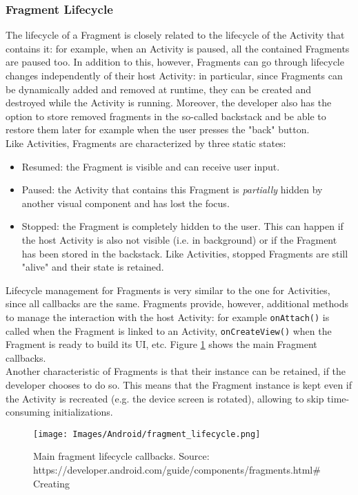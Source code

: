 \documentclass[11pt,a4paper,notitlepage]{article}
\begin{document}
\subsubsection{Fragment Lifecycle}
The lifecycle of a Fragment is closely related to the lifecycle of the Activity that contains it: for example, when an Activity is paused, all the contained Fragments are paused too. In addition to this, however, Fragments can go through lifecycle changes independently of their host Activity: in particular, since Fragments can be dynamically added and removed at runtime, they can be created and destroyed while the Activity is running. Moreover, the developer also has the option to store removed fragments in the so-called backstack and be able to restore them later for example when the user presses the "back" button.\medskip \\
Like Activities, Fragments are characterized by three static states:
\begin{itemize}
	\item Resumed: the Fragment is visible and can receive user input.
	\item Paused: the Activity that contains this Fragment is \textit{partially} hidden by another visual component and has lost the focus.
	\item Stopped: the Fragment is completely hidden to the user. This can happen if the host Activity is also not visible (i.e. in background) or if the Fragment has been stored in the backstack. Like Activities, stopped Fragments are still "alive" and their state is retained.
\end{itemize}
Lifecycle management for Fragments is very similar to the one for Activities, since all callbacks are the same. Fragments provide, however, additional methods to manage the interaction with the host Activity: for example \texttt{onAttach()} is called when the Fragment is linked to an Activity, \texttt{onCreateView()} when the Fragment is ready to build its UI, etc. Figure \ref{fig:fra_lifec} shows the main Fragment callbacks.\bigskip \\
Another characteristic of Fragments is that their instance can be retained, if the developer chooses to do so. This means that the Fragment instance is kept even if the Activity is recreated (e.g. the device screen is rotated), allowing to skip time-consuming initializations.
\begin{figure}
  \centering
  \texttt{[image: Images/Android/fragment\_lifecycle.png]}
  \caption[Fragment lifecycle]{Main fragment lifecycle callbacks. Source: https://developer.android.com/guide/components/fragments.html\#Creating}
  \label{fig:fra_lifec}
\end{figure}
\end{document}
